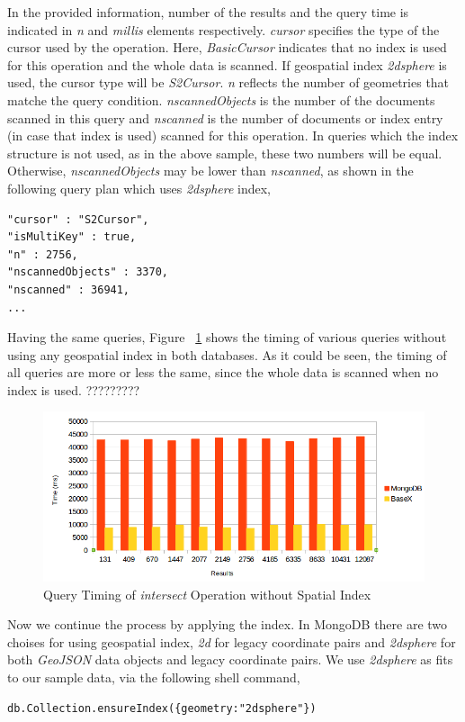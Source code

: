 \documentclass[a4paper,12pt]{article}
\begin{document}
In the provided information, number of the results and the query time is indicated in \textit{n} and \textit{millis} elements respectively. \textit{cursor} specifies the type of the cursor used by the operation. Here, \textit{BasicCursor} indicates that no index is used for this operation and the whole data is scanned. If geospatial index \textit{2dsphere} is used, the cursor type will be \textit{S2Cursor}. \textit{n} reflects the number of geometries that matche the query condition. \textit{nscannedObjects} is the number of the documents scanned in this query and \textit{nscanned} is the number of documents or index entry (in case that index is used) scanned for this operation. In queries which the index structure is not used, as in the above sample, these two numbers will be equal. Otherwise, \textit{nscannedObjects} may be lower than \textit{nscanned}, as shown in the following query plan which uses \textit{2dsphere} index, 

\begin{verbatim}
"cursor" : "S2Cursor",
"isMultiKey" : true,
"n" : 2756,
"nscannedObjects" : 3370,
"nscanned" : 36941,
...
\end{verbatim}

Having the same queries, Figure ~\ref{figBXvsMongoNoIndexIntersects} shows the timing of various queries without using any geospatial index in both databases. As it could be seen, the timing of all queries are more or less the same, since the whole data is scanned when no index is used. ?????????

\begin{figure}
\centering
\includegraphics[width=\textwidth,height=0.25\textheight]{BXvsMongo-NoIndex-Intersects}
\caption{Query Timing of \textit{intersect} Operation without Spatial Index}
\label{figBXvsMongoNoIndexIntersects}
\end{figure}

Now we continue the process by applying the index. In MongoDB there are two choises for using geospatial index, \textit{2d} for legacy coordinate pairs and \textit{2dsphere} for both \textit{GeoJSON} data objects and legacy coordinate pairs. We use \textit{2dsphere} as fits to our sample data, via the following shell command,
\begin{verbatim}
db.Collection.ensureIndex({geometry:"2dsphere"})  
\end{verbatim}
\end{document}
